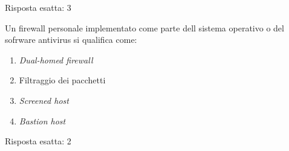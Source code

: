 \begin{Answer} [
  ref={netriep5},
  number={5}
  ]

  \Question Risposta esatta: 3

\end{Answer}


\begin{Exercise} [
  title={Quiz},
  label={netriep6}
  ]

  \Question Un firewall personale implementato come parte dell sistema
operativo o del sofrware antivirus si qualifica come:
\begin{enumerate}
 \item \textit{Dual-homed firewall}
 \item Filtraggio dei pacchetti
 \item \textit{Screened host}
 \item \textit{Bastion host}
\end{enumerate}

\end{Exercise}


\begin{Answer} [
  ref={netriep6},
  number={6}
  ]

  \Question Risposta esatta: 2

\end{Answer}
